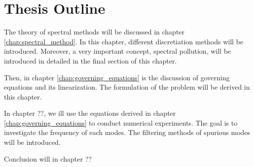 \section{Thesis Outline}
The theory of spectral methods will be discussed in chapter \ref{chap:spectral_method}. In this chapter, different discretiation methods will be introduced. Moreover, a very important concept, spectral pollution, will be introduced in detailed in the final section of this chapter.

Then, in chapter \ref{chap:governing_equations} is the discussion of governing equations and its linearization. The formulation of the problem will be derived in this chapter.

In chapter ??, we ill use the equations derived in chapter \ref{chap:governing_equations} to conduct numerical experiments. The goal is to investigate the frequency of each modes. The filtering methods of spurious modes will be introduced.

Conclusion will in chapter ??

